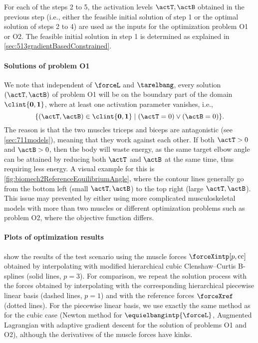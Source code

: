 %
For each of the steps 2 to 5, the activation levels $\actT, \actB$ obtained
in the previous step (i.e., either the feasible initial solution
of step 1 or the optimal solution of steps 2 to 4) are used
as the inputs for the optimization problem O1 or O2.
The feasible initial solution in step 1 is determined as explained
in \cref{sec:513gradientBasedConstrained}.

\paragraph{Solutions of problem O1}

We note that independent of $\forceL$ and $\tarelbang$,
every solution $(\actT, \actB)$ of problem O1 will be
on the boundary part of the domain $\clint{\*0, \*1}$,
where at least one activation parameter vanishes, i.e.,
\begin{equation}
  \{(\actT, \actB) \in \clint{\*0, \*1} \mid
  (\actT = 0) \lor (\actB = 0)\}.
\end{equation}
The reason is that the two muscles triceps and biceps are antagonistic
(see \cref{sec:711models}), meaning that they work against each other.
If both $\actT > 0$ and $\actB > 0$, then the body will waste energy,
as the same target elbow angle can be attained by reducing both
$\actT$ and $\actB$ at the same time, thus requiring less energy.
A visual example for this is \cref{fig:biomech2ReferenceEquilibriumAngle},
where the contour lines generally go from the bottom left
(small $\actT, \actB$) to the top right (large $\actT, \actB$).
This issue may prevented by either
using more complicated musculoskeletal models with more
than two muscles or different optimization problems
such as problem O2, where the objective function differs.

\paragraph{Plots of optimization results}

show the results of the test scenario using the muscle forces
$\forceXintp[p,\cc]$ obtained by interpolating with
modified hierarchical cubic Clenshaw--Curtis B-splines (solid lines, $p = 3$).
For comparison, we repeat the solution process
with the forces obtained by interpolating with the
corresponding hierarchical piecewise linear basis (dashed lines, $p = 1$) and
with the reference forces $\forceXref$ (dotted lines).
For the piecewise linear basis,
we use exactly the same method as for the cubic case
(Newton method for $\equielbangintp{\forceL}$,
Augmented Lagrangian with adaptive gradient descent for the
solution of problems O1 and O2),
although the derivatives of the muscle forces have kinks.

